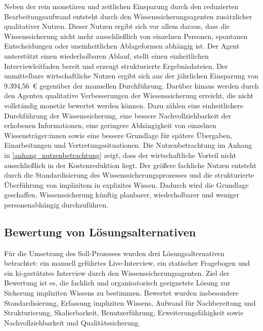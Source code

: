 \documentclass[
  10pt,
  ngerman,
  a4paper,
  toc=graduated,
  numbers=noenddot,
  headings=standardclasses,
  nonumberlist
]{scrartcl}
\begin{document}
Neben der rein monetären und zeitlichen Einsparung durch den reduzierten Bearbeitungsaufwand entsteht durch den Wissenssicherungsagenten zusätzlicher qualitativer Nutzen. Dieser Nutzen ergibt sich vor allem daraus, dass die Wissenssicherung nicht mehr ausschließlich von einzelnen Personen, spontanen Entscheidungen oder uneinheitlichen Ablageformen abhängig ist. Der Agent unterstützt einen wiederholbaren Ablauf, stellt einen einheitlichen Interviewleitfaden bereit und erzeugt strukturierte Ergebnisdateien. Der unmittelbare wirtschaftliche Nutzen ergibt sich aus der jährlichen Einsparung von 9.394,56~\euro{} gegenüber der manuellen Durchführung. Darüber hinaus werden durch den Agenten qualitative Verbesserungen der Wissenssicherung erreicht, die nicht vollständig monetär bewertet werden können. Dazu zählen eine einheitlichere Durchführung der Wissenssicherung, eine bessere Nachvollziehbarkeit der erhobenen Informationen, eine geringere Abhängigkeit von einzelnen Wissensträger:innen sowie eine bessere Grundlage für spätere Übergaben, Einarbeitungen und Vertretungssituationen. Die Nutzenbetrachtung im Anhang in \ref{anhang_nutzenbetrachtung} zeigt, dass der wirtschaftliche Vorteil nicht ausschließlich in der Kostenreduktion liegt. Der größere fachliche Nutzen entsteht durch die Standardisierung des Wissenssicherungsprozesses und die strukturierte Überführung von implizitem in explizites Wissen. Dadurch wird die Grundlage geschaffen, Wissenssicherung künftig planbarer, wiederholbarer und weniger personenabhängig durchzuführen.

\subsection{Bewertung von Lösungsalternativen}
\label{bewertung_von_lösungsalternativen}
Für die Umsetzung des Soll-Prozesses wurden drei Lösungsalternativen betrachtet: ein manuell geführtes Live-Interview, ein statischer Fragebogen und ein \gls{ki}-gestütztes Interview durch den Wissenssicherungsagenten. Ziel der Bewertung ist es, die fachlich und organisatorisch geeignetste Lösung zur Sicherung impliziten Wissens zu bestimmen. Bewertet wurden insbesondere Standardisierung, Erfassung impliziten Wissens, Aufwand für Nachbereitung und Strukturierung, Skalierbarkeit, Benutzerführung, Erweiterungsfähigkeit sowie Nachvollziehbarkeit und Qualitätssicherung.

\end{document}

